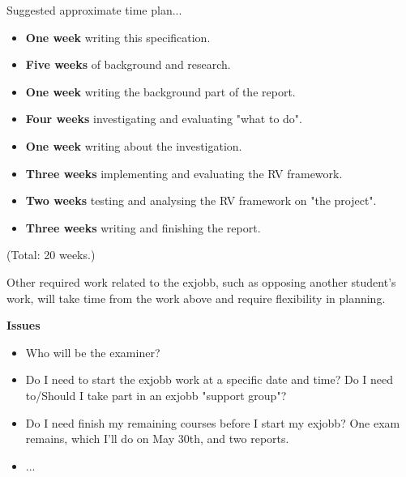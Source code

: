 \documentclass[a4paper,11pt]{kth-mag}
\begin{document}
Suggested approximate time plan...

\begin{itemize}
	\item \textbf{One week} writing this specification.
	\item \textbf{Five weeks} of background and research.
	\item \textbf{One week} writing the background part of the report.
	\item \textbf{Four weeks} investigating and evaluating "what to do".
	\item \textbf{One week} writing about the investigation.
	\item \textbf{Three weeks} implementing and evaluating the RV framework.
	\item \textbf{Two weeks} testing and analysing the RV framework on "the project".
	\item \textbf{Three weeks} writing and finishing the report.
\end{itemize}

(Total: 20 weeks.)

Other required work related to the exjobb, such as opposing another student's work, will take time from the work above and require flexibility in planning.

\textbf{Issues}

\begin{itemize}
	\item Who will be the examiner?
	\item Do I need to start the exjobb work at a specific date and time? Do I need to/Should I take part in an exjobb "support group"?
	\item Do I need finish my remaining courses before I start my exjobb? One exam remains, which I'll do on May 30th, and two reports.
	\item ...
\end{itemize}
\end{document}

